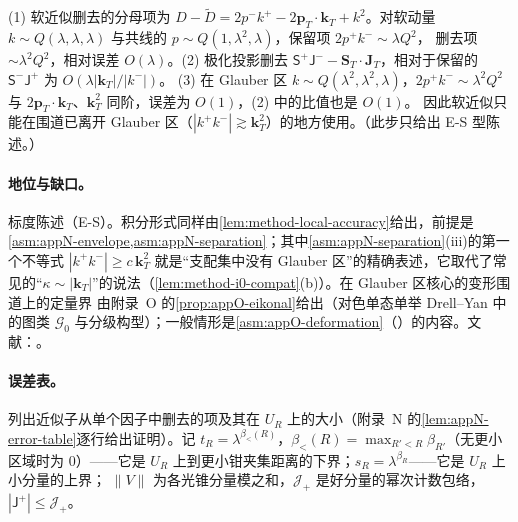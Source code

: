 \begin{proofsketch}
(1) 软近似删去的分母项为 $D-\tilde D=2p^-k^+-2\mathbf p_T\cdot\mathbf k_T+k^2$。对软动量 $k\sim Q(\lambda,\lambda,\lambda)$ 与共线的 $p\sim Q(1,\lambda^2,\lambda)$，保留项 $2p^+k^-\sim\lambda Q^2$，
删去项 $\sim\lambda^2Q^2$，相对误差 $O(\lambda)$。(2) 极化投影删去 $\mathsf S^+\mathsf J^--\mathbf S_T\cdot\mathbf J_T$，相对于保留的 $\mathsf S^-\mathsf J^+$ 为 $O(\lambda|\mathbf k_T|/|k^-|)$。%
(3) 在 Glauber 区 $k\sim Q(\lambda^2,\lambda^2,\lambda)$，$2p^+k^-\sim\lambda^2Q^2$ 与 $2\mathbf p_T\cdot\mathbf k_T$、$\mathbf k_T^2$ 同阶，误差为 $O(1)$，(2) 中的比值也是 $O(1)$。
因此软近似只能在围道已离开 Glauber 区（$|k^+k^-|\gtrsim\mathbf k_T^2$）的地方使用。（此步只给出 E-S 型陈述。）
\end{proofsketch}

\paragraph{地位与缺口。}标度陈述（E-S）。积分形式同样由\cref{lem:method-local-accuracy}给出，前提是\cref{asm:appN-envelope,asm:appN-separation}；其中\cref{asm:appN-separation}(iii)的第一个不等式 $|k^+k^-|\ge c\,\mathbf k_T^2$
就是“支配集中没有 Glauber 区”的精确表述，它取代了常见的“$\kappa\sim|\mathbf k_T|$”的说法（\cref{lem:method-i0-compat}(b)）。在 Glauber 区核心的变形围道上的定量界
由附录~O 的\cref{prop:appO-eikonal}给出（对色单态单举 Drell--Yan 中的图类 $\mathcal G_0$ 与分级构型）；一般情形是\cref{asm:appO-deformation}（\tagA）的内容。文献：\cite[第~10~章]{Collins2011}。

\paragraph{误差表。}列出近似子从单个因子中删去的项及其在 $U_R$ 上的大小（附录~N 的\cref{lem:appN-error-table}逐行给出证明）。记
$t_R=\lambda^{\beta_<(R)}$，$\beta_<(R)=\max_{R'<R}\beta_{R'}$（无更小区域时为 $0$）——它是 $U_R$ 上到更小钳夹集距离的下界；$s_R=\lambda^{\beta_R}$——它是 $U_R$ 上小分量的上界；
$\|V\|$ 为各光锥分量模之和，$\mathcal J_+$ 是好分量的幂次计数包络，$|\mathsf J^+|\le\mathcal J_+$。

